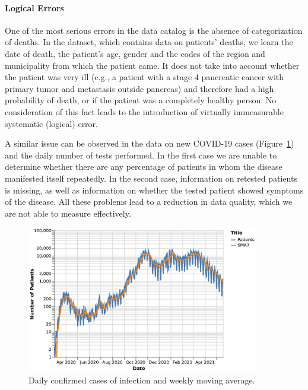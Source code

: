 \paragraph{Logical Errors} One of the most serious errors in the data catalog is the absence of categorization of deaths.
In the dataset, which contains data on patients' deaths, we learn the date of death, the patient's age, gender and the codes of the region and municipality from which the patient came.
It does not take into account whether the patient was very ill (e.g., a patient with a stage 4 pancreatic cancer with primary tumor and metastasis outside pancreas) and therefore had a high probability of death, or if the patient was a completely healthy person.
No consideration of this fact leads to the introduction of virtually immeasurable systematic (logical) error.

A similar issue can be observed in the data on new COVID-19 cases (Figure~\ref{fig:new-cases}) and the daily number of tests performed.
In the first case we are unable to determine whether there are any percentage of patients in whom the disease manifested itself repeatedly.
In the second case, information on retested patients is missing, as well as information on whether the tested patient showed symptoms of the disease.
All these problems lead to a reduction in data quality, which we are not able to measure effectively.

\begin{figure}[htb]
    \centering
    \includegraphics[width=0.9\textwidth]{figures/new-cases.eps}
    \caption{Daily confirmed cases of infection and weekly moving average.}
    \label{fig:new-cases}
\end{figure}
\FloatBarrier

